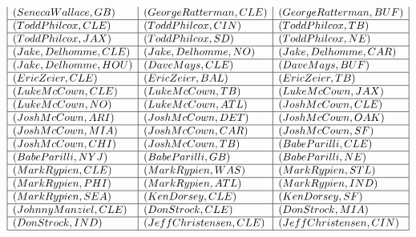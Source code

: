 \documentclass{ximera}
\begin{document}
\begin{center}
\[\begin{array}{|l|l|l|}
(Seneca Wallace, GB) & (George Ratterman, CLE) & (George Ratterman, BUF) \\\hline 


(Todd Philcox, CLE) & (Todd Philcox, CIN) & (Todd Philcox, TB) \\\hline 


(Todd Philcox, JAX) & (Todd Philcox, SD) & (Todd Philcox, NE) \\\hline 


(Jake, Delhomme, CLE) & (Jake, Delhomme, NO) & (Jake, Delhomme, CAR) \\\hline 


(Jake, Delhomme, HOU) & (Dave Mays, CLE) & (Dave Mays, BUF) \\\hline 


(Eric Zeier, CLE) & (Eric Zeier, BAL) & (Eric Zeier, TB) \\\hline 


(Luke McCown, CLE) & (Luke McCown, TB) & (Luke McCown, JAX) \\\hline 


(Luke McCown, NO) & (Luke McCown, ATL) & (Josh McCown, CLE) \\\hline 


(Josh McCown, ARI) & (Josh McCown, DET) & (Josh McCown, OAK) \\\hline 


(Josh McCown, MIA) & (Josh McCown, CAR) & (Josh McCown, SF) \\\hline 


(Josh McCown, CHI) & (Josh McCown, TB) & (Babe Parilli, CLE) \\\hline 


(Babe Parilli, NYJ) & (Babe Parilli, GB) & (Babe Parilli, NE) \\\hline 


(Mark Rypien, CLE) & (Mark Rypien, WAS) & (Mark Rypien, STL) \\\hline 


(Mark Rypien, PHI) & (Mark Rypien, ATL) & (Mark Rypien, IND) \\\hline 


(Mark Rypien, SEA) & (Ken Dorsey, CLE) & (Ken Dorsey, SF) \\\hline 


(Johnny Manziel, CLE) & (Don Strock, CLE) & (Don Strock, MIA) \\\hline 


(Don Strock, IND) & (Jeff Christensen, CLE) & (Jeff Christensen, CIN) \\\hline 



\end{array}\]
\end{center}
\end{document}
